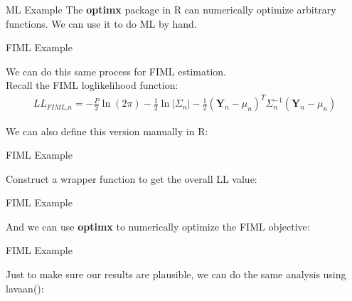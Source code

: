 \documentclass{beamer}
\begin{document}
\begin{frame}[allowframebreaks]{ML Example}
  The \textbf{optimx} package in R can numerically optimize arbitrary
  functions. We can use it to do ML by hand.



\pagebreak



\end{frame}


\begin{frame}{FIML Example}

  We can do this same process for FIML estimation.\\
  \vspace{12pt}
  Recall the FIML loglikelihood function:
   \begin{align*}
    \textit{LL}_{\textit{FIML,n}} = -\frac{P}{2} \ln(2\pi) -
    \frac{1}{2} \ln | \Sigma_n | - \frac{1}{2} (\mathbf{Y}_n -
    \mu_n)^T \Sigma_n^{-1}(\mathbf{Y}_n - \mu_n)
  \end{align*}

   \vspace{12pt}

   We can also define this version manually in \textsf{R}:



\end{frame}


\begin{frame}[shrink = 10]{FIML Example}

  Construct a wrapper function to get the overall LL value:



\end{frame}


\begin{frame}[allowframebreaks]{FIML Example}

  And we can use \textbf{optimx} to numerically optimize the FIML
  objective:



\end{frame}


\begin{frame}[allowframebreaks]{FIML Example}

  Just to make sure our results are plausible, we can do the same
  analysis using lavaan():



\pagebreak



\end{frame}
\end{document}
